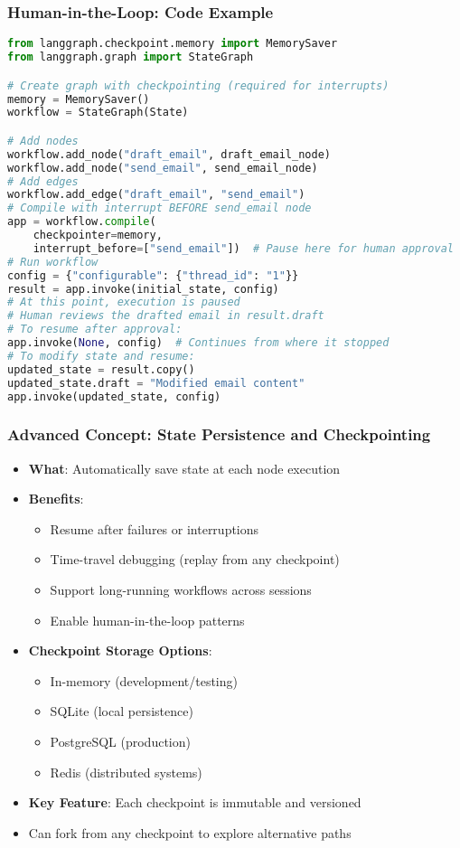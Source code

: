 \begin{frame}[fragile]\frametitle{Human-in-the-Loop: Code Example}
      \begin{lstlisting}[language=Python, basicstyle=\tiny]
from langgraph.checkpoint.memory import MemorySaver
from langgraph.graph import StateGraph

# Create graph with checkpointing (required for interrupts)
memory = MemorySaver()
workflow = StateGraph(State)

# Add nodes
workflow.add_node("draft_email", draft_email_node)
workflow.add_node("send_email", send_email_node)
# Add edges
workflow.add_edge("draft_email", "send_email")
# Compile with interrupt BEFORE send_email node
app = workflow.compile(
    checkpointer=memory,
    interrupt_before=["send_email"])  # Pause here for human approval
# Run workflow
config = {"configurable": {"thread_id": "1"}}
result = app.invoke(initial_state, config)
# At this point, execution is paused
# Human reviews the drafted email in result.draft
# To resume after approval:
app.invoke(None, config)  # Continues from where it stopped
# To modify state and resume:
updated_state = result.copy()
updated_state.draft = "Modified email content"
app.invoke(updated_state, config)
      \end{lstlisting}
\end{frame}

\begin{frame}[fragile]\frametitle{Advanced Concept: State Persistence and Checkpointing}
      \begin{itemize}
        \item \textbf{What}: Automatically save state at each node execution
        \item \textbf{Benefits}:
        \begin{itemize}
            \item Resume after failures or interruptions
            \item Time-travel debugging (replay from any checkpoint)
            \item Support long-running workflows across sessions
            \item Enable human-in-the-loop patterns
        \end{itemize}
        \item \textbf{Checkpoint Storage Options}:
        \begin{itemize}
            \item In-memory (development/testing)
            \item SQLite (local persistence)
            \item PostgreSQL (production)
            \item Redis (distributed systems)
        \end{itemize}
        \item \textbf{Key Feature}: Each checkpoint is immutable and versioned
        \item Can fork from any checkpoint to explore alternative paths
      \end{itemize}
\end{frame}

